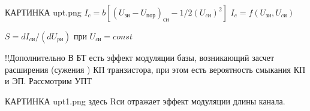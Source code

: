 КАРТИНКА upt.png
$I_c = b[(U_\textit{зи} - U_\textit{пор})_\textit{си}-1/2(U_\textit{cи})^2]$
$I_c =f(U_\textit{зи}, U_\textit{cи})$

$S = dI_\textit{cи}/(dU_\textit{pи}) $ при $U_\textit{cи}=const$

!!Дополнительно
В БТ есть эффект модуляции базы, возникающий засчет расширения (сужения ) КП транзистора, при этом есть вероятность смыкания КП и ЭП.
Рассмотрим УПТ

КАРТИНКА upt1.png
здесь Rси отражает эффект модуляции длины канала.


